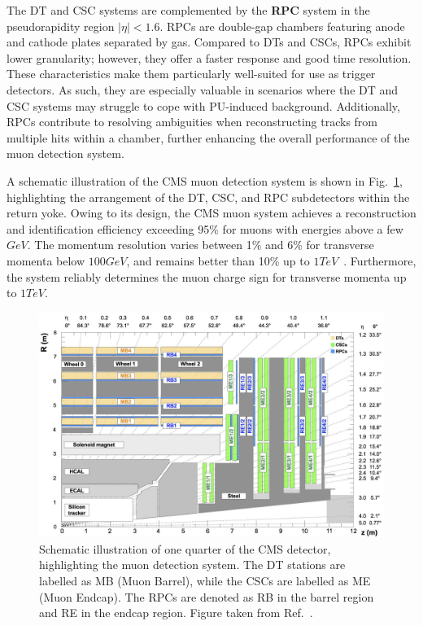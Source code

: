 The DT and CSC systems are complemented by the \textbf{\ac{RPC}} system in the pseudorapidity region $|\eta| < 1.6$. RPCs are double-gap chambers featuring anode and cathode plates separated by gas. Compared to DTs and CSCs, RPCs exhibit lower granularity; however, they offer a faster response and good time resolution. These characteristics make them particularly well-suited for use as trigger detectors. As such, they are especially valuable in scenarios where the DT and CSC systems may struggle to cope with PU-induced background. Additionally, RPCs contribute to resolving ambiguities when reconstructing tracks from multiple hits within a chamber, further enhancing the overall performance of the muon detection system.

A schematic illustration of the CMS muon detection system is shown in Fig.~\ref{Figure:Chapter3_CMS_Muon_System}, highlighting the arrangement of the DT, CSC, and RPC subdetectors within the return yoke. Owing to its design, the CMS muon system achieves a reconstruction and identification efficiency exceeding 95\% for muons with energies above a few $\unit{GeV}$. The momentum resolution varies between 1\% and 6\% for transverse momenta below $100\unit{GeV}$, and remains better than 10\% up to $1\unit{TeV}$~\cite{CMS_Muon_System_Performance_2}. Furthermore, the system reliably determines the muon charge sign for transverse momenta up to $1\unit{TeV}$.


\begin{figure}[h]
\centering
\includegraphics[width= 1.0\textwidth]{Figures/Chapter3/CMS_Muon_System.pdf}
\caption[Schematic of CMS muon detection system]{Schematic illustration of one quarter of the CMS detector, highlighting the muon detection system. The DT stations are labelled as MB (Muon Barrel), while the CSCs are labelled as ME (Muon Endcap). The RPCs are denoted as RB in the barrel region and RE in the endcap region. Figure taken from Ref.~\cite{CMS_Muon_System_Performance}.}
\label{Figure:Chapter3_CMS_Muon_System}
\end{figure}

